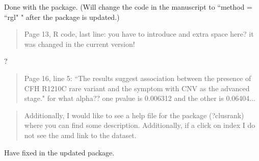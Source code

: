 \documentclass[12pt]{article}
\newenvironment{comment}%
{\begin{quotation}\noindent\small\it\ignorespaces%
  }{\end{quotation}}
\begin{document}
Done with the package. (Will change the code in the manuscript to ``method =
``rgl" " after the package is updated.)

\begin{comment}
Page 13, R code, last line: you have to introduce and extra space here? it was
changed in the current version!
\end{comment}

?

\begin{comment}

Page 16, line 5: ``The results suggest association between the presence of CFH
R1210C rare variant and the symptom with CNV as the advanced stage." for what
alpha?? one pvalue is 0.006312 and the other is 0.06404...
\end{comment}

\begin{comment}
Additionally, I would like to see a help file for the package (?clusrank)
where you can find some description.
Additionally, if a click on index I do not see the amd link to the dataset.
\end{comment}

Have fixed in the updated package.



\end{document}
